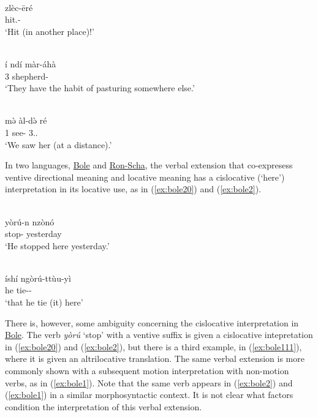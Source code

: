 \ea\label{ex:mada2}
 \\
\gll  zlèc-ēré \\
hit.-		\\
\glt `Hit (in another place)!'

\ex\label{ex:mina7}
 \\
\gll í	ndí	màr-áhà		\\
3		shepherd-	 \\
\glt `They have the habit of pasturing somewhere else.'

\ex\label{ex:kana8}
 \\
\gll mə̀	àl-də̀	ré \\
1	see-	3.. \\
\glt `We saw her (at a distance).'
\z 

In two languages, \hyperref[bole]{Bole} and \hyperref[shaa]{Ron-Scha}, the verbal extension that co-expresess ventive directional meaning and locative meaning has a cislocative (`here') interpretation in its locative use, as in (\ref{ex:bole20}) and (\ref{ex:bole2}). 

\ea\label{ex:bole20}
 \\
\gll yòrú-n nzònó	\\ 
stop- yesterday		\\
\glt `He stopped here yesterday.'

\ex\label{ex:bole2}
 \\
\gll íshí	ngòrú-ttùu-yì \\
he	tie-- \\
\glt `that he tie (it) here'
\z 

There is, however, some ambiguity concerning the cislocative interpretation in \hyperref[bole]{Bole}. The verb \textit{yòrú} `stop' with a ventive suffix is given a cislocative intepretation in (\ref{ex:bole20}) and (\ref{ex:bole2}), but there is a third example, in (\ref{ex:bole111}), where it is given an altrilocative translation. The same verbal extension is more commonly shown with a subsequent motion interpretation with non-motion verbs, as in (\ref{ex:bole1}). Note that the same verb appears in (\ref{ex:bole2}) and (\ref{ex:bole1}) in a similar morphosyntactic context. It is not clear what factors condition the interpretation of this verbal extension. 

